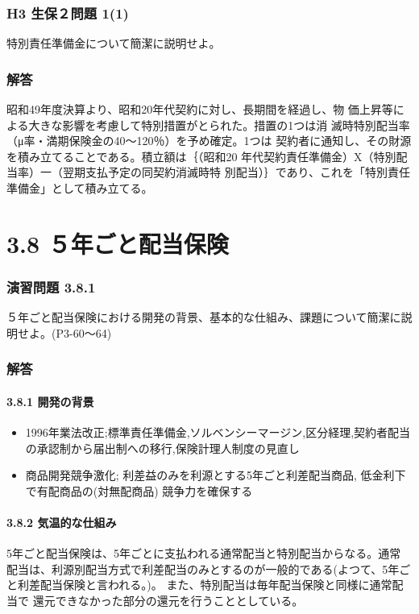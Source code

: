 \documentclass[report,gutter=10mm,fore-edge=10mm,uplatex,dvipdfmx]{jlreq}
\begin{document}
\subsubsection{H3 生保２問題 1(1)}
特別責任準備金について簡潔に説明せよ。
\subsubsection{解答}
昭和49年度決算より、昭和20年代契約に対し、長期間を経過し、物
価上昇等による大きな影響を考慮して特別措置がとられた。措置の1つは消
滅時特別配当率（μ率・満期保険金の40〜120％）を予め確定。1つは
契約者に通知し、その財源を積み立てることである。積立額は｛（昭和20
年代契約責任準備金）X（特別配当率）一（翌期支払予定の同契約消滅時特
別配当）｝であり、これを「特別責任準備金」として積み立てる。

\section{3.8 ５年ごと配当保険}
\subsubsection{演習問題 3.8.1}
５年ごと配当保険における開発の背景、基本的な仕組み、課題について簡潔に説明せよ。(P3-60〜64)
\subsubsection{解答}

\paragraph{3.8.1 開発の背景}
\begin{itemize}
 \item 1996年業法改正;標準責任準備金,ソルベンシーマージン,区分経理,契約者配当の承認制から届出制への移行,保険計理人制度の見直し
 \item 商品開発競争激化; 利差益のみを利源とする5年ごと利差配当商品, 低金利下で有配商品の(対無配商品) 競争力を確保する
\end{itemize}
\paragraph{3.8.2 気温的な仕組み}

5年ごと配当保険は、5年ごとに支払われる通常配当と特別配当からなる。通常
配当は、利源別配当方式で利差配当のみとするのが一般的である(よつて、5年ご
と利差配当保険と言われる。)。
また、特別配当は毎年配当保険と同様に通常配当で
還元できなかった部分の還元を行うこととしている。
\end{document}

